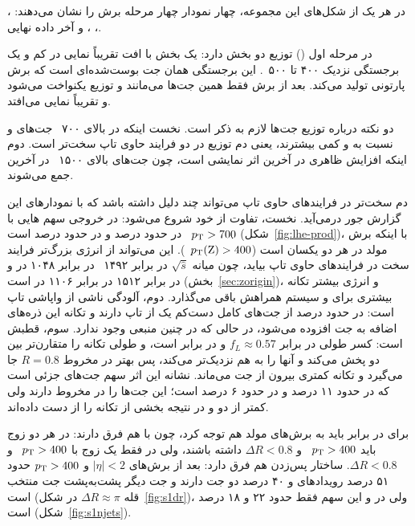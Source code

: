 در هر یک از شکل‌های این مجموعه، چهار نمودار چهار مرحله برش را نشان می‌دهند: ، ، ، و آخر داده نهایی.

در مرحله اول () توزیع \pt دو بخش دارد: یک بخش با افت تقریباً نمایی در \pt کم و یک برجستگی نزدیک ۴۰۰ تا ۵۰۰~. این برجستگی همان جت بوست‌شده‌ای است که برش پارتونی  تولید می‌کند. بعد از برش  فقط همین جت‌ها می‌مانند و توزیع یکنواخت می‌شود و تقریباً نمایی می‌افتد.

دو نکته درباره توزیع \pt جت‌ها لازم به ذکر است. نخست اینکه در \pt بالای ۷۰۰~ جت‌های \ttZ و \ttbb نسبت به \Zjet و \bbbb کمی بیشترند، یعنی دم توزیع در دو فرایند حاوی تاپ سخت‌تر است. دوم اینکه افزایش ظاهری در آخرین  اثر نمایشی است، چون جت‌های بالای ۱۵۰۰~ در آخرین  جمع می‌شوند.

دم سخت‌تر در فرایندهای حاوی تاپ می‌تواند چند دلیل داشته باشد که با نمودارهای این گزارش جور درمی‌آید. نخست، تفاوت از خود \Zbos{} شروع می‌شود: در خروجی  سهم \Zbos{}هایی با $p_\mathrm{T}>700$~ در \ttZ حدود  درصد و در \Zjet حدود  درصد است (شکل~\ref{fig:lhe-prod})، با اینکه برش مولد در هر دو یکسان است ($p_\mathrm{T}(\mathrm{Z})>400$~). این می‌تواند از انرژی بزرگ‌تر فرایند سخت در فرایندهای حاوی تاپ بیاید، چون میانه $\sqrt{\hat s}$ در \ttZ برابر ۱۴۹۲~ در برابر ۱۰۴۸ در \Zjet و در \ttbb برابر ۱۵۱۲ در برابر ۱۱۰۶ در \bbbb است (بخش~\ref{sec:zorigin})، و انرژی بیشتر تکانه بیشتری برای \Zbos{} و سیستم همراهش باقی می‌گذارد. دوم، آلودگی ناشی از واپاشی تاپ است: در \ttZ حدود  درصد از جت‌های کامل \Zbos{} دست‌کم یک \bq{} از تاپ دارند و تکانه این ذره‌های اضافه به جت افزوده می‌شود، در حالی که در \Zjet چنین منبعی وجود ندارد. سوم، قطبش \Zbos{} است: کسر طولی در \ttZ برابر $f_L\approx0.57$ و در \Zjet برابر  است، و \Zbos{} طولی تکانه را متقارن‌تر بین دو \bq{} پخش می‌کند و آنها را به هم نزدیک‌تر می‌کند، پس \Zbos{} بهتر در مخروط $R=0.8$ جا می‌گیرد و تکانه کمتری بیرون از جت می‌ماند. نشانه این اثر سهم جت‌های جزئی است که در \Zjet حدود ۱۱ درصد و در \ttZ حدود ۶ درصد است؛ این جت‌ها \Zbos{} را در مخروط دارند ولی کمتر از دو \bq{} و در نتیجه بخشی از تکانه \Zbos{} را از دست داده‌اند.

برای \ttbb در برابر \bbbb باید به برش‌های مولد هم توجه کرد، چون با هم فرق دارند: در \bbbb هر دو زوج باید $p_\mathrm{T}>400$~ و $\Delta R<0.8$ داشته باشند، ولی در \ttbb فقط یک زوج با $p_\mathrm{T}>400$~ و $\Delta R<0.8$. ساختار پس‌زدن هم فرق دارد: بعد از برش‌های $|\eta|<2$ و $p_\mathrm{T}>400$ حدود ۵۱ درصد رویدادهای \Zjet و ۴۰ درصد \bbbb دو جت دارند و جت دیگر پشت‌به‌پشت جت منتخب است (قله $\Delta R\approx\pi$ در شکل~\ref{fig:s1dr})، ولی در \ttZ و \ttbb این سهم فقط حدود ۲۲ و ۱۸ درصد است (شکل~\ref{fig:s1njets}).

